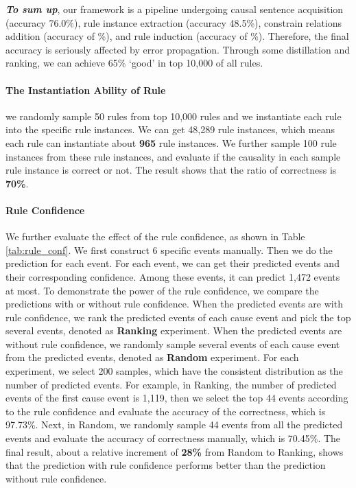 \textbf{\textit{To sum up}}, our framework is a pipeline undergoing causal sentence acquisition (accuracy 76.0\%), rule instance extraction (accuracy 48.5\%), constrain relations addition (accuracy of \%), and rule induction (accuracy of \%).
Therefore, the final accuracy is seriously affected by error propagation. 
Through some distillation and ranking, we can achieve 65\% `good' in top 10,000 of all rules.

\paragraph{The Instantiation Ability of Rule}
we randomly sample 50 rules from top 10,000 rules and we instantiate each rule into the specific rule instances. 
We can get 48,289 rule instances, which means each rule can instantiate about \textbf{965} rule instances. 
We further sample 100 rule instances from these rule instances, and evaluate if the causality in each sample rule instance is correct or not. 
The result shows that the ratio of correctness is \textbf{70\%}.

\paragraph{Rule Confidence}
We further evaluate the effect of the rule confidence, as shown in Table \ref{tab:rule_conf}.
We first construct 6 specific events manually.
Then we do the prediction for each event.
For each event, we can get their predicted events and their corresponding confidence. Among these events, it can predict 1,472 events at most.
To demonstrate the power of the rule confidence, we compare the predictions with or without rule confidence. When the predicted events are with rule confidence, we rank the predicted events of each cause event and pick the top several events, denoted as \textbf{Ranking} experiment.
When the predicted events are without rule confidence, we randomly sample several events of each cause event from the predicted events, denoted as \textbf{Random} experiment.
For each experiment, we select 200 samples, which have the consistent distribution as the number of predicted events. 
For example, in Ranking, the number of predicted events of the first cause event is 1,119, then we select the top 44 events according to the rule confidence and evaluate the accuracy of the correctness, which is 97.73\%. 
Next, in Random, we randomly sample 44 events from all the predicted events and evaluate the accuracy of correctness manually, which is 70.45\%. 
The final result, about a relative increment of \textbf{28\%} from Random to Ranking, shows that the prediction with rule confidence performs better than the prediction without rule confidence. 


